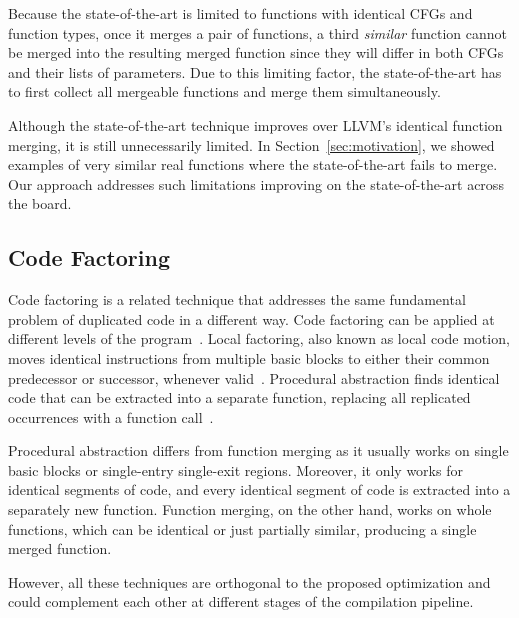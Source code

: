 Because the state-of-the-art is limited to functions with identical CFGs
and function types, once it merges a pair of functions, a third
\textit{similar} function cannot be merged into the resulting merged function
since they will differ in both CFGs and their lists of parameters.
Due to this limiting factor, the state-of-the-art has to first collect all
mergeable functions and merge them simultaneously.

Although the state-of-the-art technique improves over LLVM's identical function merging, it is
still unnecessarily limited. In Section~\ref{sec:motivation}, we showed examples of very similar
real functions where the state-of-the-art fails to merge. Our approach addresses such limitations
improving on the state-of-the-art across the board.

\subsection{Code Factoring}

Code factoring is a related technique that addresses the same fundamental
problem of duplicated code in a different way.
Code factoring can be applied at different levels of the program~\cite{loki04}.
Local factoring, also known as local code motion, moves identical instructions
from multiple basic blocks to either their common predecessor or successor,
whenever valid~\cite{knoop94,briggs94,loki04}.
Procedural abstraction %
finds identical code
that can be extracted into a separate function, replacing all replicated
occurrences with a function call~\cite{loki04,dreweke07}.

Procedural abstraction differs from function merging as it usually works on
single basic blocks or single-entry single-exit regions.
Moreover, it only works for identical segments of code, and every identical
segment of code is extracted into a separately new function.
Function merging, on the other hand, works on whole functions, which can be
identical or just partially similar, producing a single merged function.

However, all these techniques are orthogonal to the proposed optimization and
could complement each other at different stages of the compilation pipeline.
